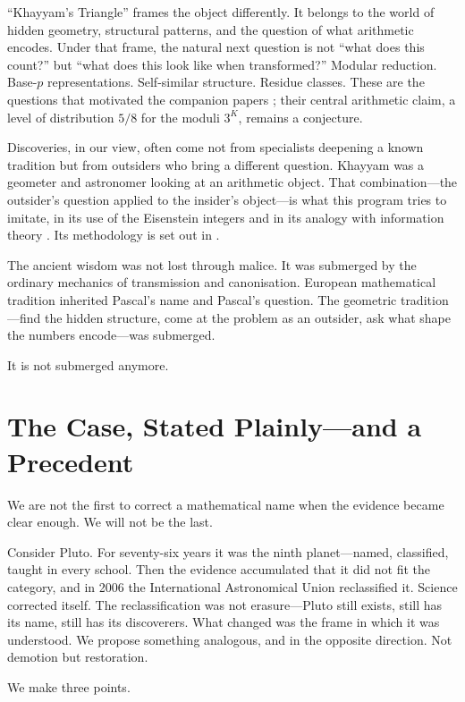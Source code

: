 \documentclass[11pt]{amsart}
\begin{document}
``Khayyam's Triangle'' frames the object differently. It belongs to the world of hidden geometry, structural patterns, and the question of what arithmetic encodes. Under that frame, the natural next question is not ``what does this count?'' but ``what does this look like when transformed?'' Modular reduction. Base-$p$ representations. Self-similar structure. Residue classes. These are the questions that motivated the companion papers \cite{ramanujan,eisenstein,w3condition}; their central arithmetic claim, a level of distribution $5/8$ for the moduli $3^K$, remains a conjecture.

Discoveries, in our view, often come not from specialists deepening a known tradition but from outsiders who bring a different question. Khayyam was a geometer and astronomer looking at an arithmetic object. That combination---the outsider's question applied to the insider's object---is what this program tries to imitate, in its use of the Eisenstein integers \cite{eisenstein} and in its analogy with information theory \cite{shannon}. Its methodology is set out in \cite{spherical}.

The ancient wisdom was not lost through malice. It was submerged by the ordinary mechanics of transmission and canonisation. European mathematical tradition inherited Pascal's name and Pascal's question. The geometric tradition---find the hidden structure, come at the problem as an outsider, ask what shape the numbers encode---was submerged.

It is not submerged anymore.

\section{The Case, Stated Plainly---and a Precedent}

We are not the first to correct a mathematical name when the evidence became clear enough. We will not be the last.

Consider Pluto. For seventy-six years it was the ninth planet---named, classified, taught in every school. Then the evidence accumulated that it did not fit the category, and in 2006 the International Astronomical Union reclassified it. Science corrected itself. The reclassification was not erasure---Pluto still exists, still has its name, still has its discoverers. What changed was the frame in which it was understood. We propose something analogous, and in the opposite direction. Not demotion but restoration.

We make three points.
\end{document}
